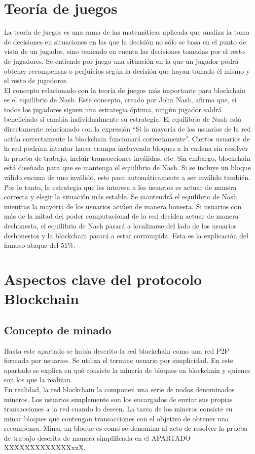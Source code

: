 \section{Teoría de juegos}
La teoría de juegos es una rama de las matemáticas aplicada que analiza la toma de decisiones en situaciones en las que la decisión no sólo se basa en el punto de vista de un jugador, sino teniendo en cuenta las decisiones tomadas por el resto de jugadores. Se entiende por juego una situación en la que un jugador podrá obtener recompensas o perjuicios según la decisión que hayan tomado él mismo y el resto de jugadores. \\
El concepto relacionado con la teoría de juegos más importante para blockchain es el equilibrio de Nash. Este concepto, creado por John Nash, afirma que, si todos los jugadores siguen una estrategia óptima, ningún jugador saldrá beneficiado si cambia individualmente su estrategia. El equilibrio de Nash está directamente relacionado con la expresión “Si la mayoría de los usuarios de la red actúa correctamente la blockchain funcionará correctamente”. Ciertos usuarios de la red podrían intentar hacer trampa incluyendo bloques a la cadena sin resolver la prueba de trabajo, incluir transacciones inválidas, etc. Sin embargo, blockchain está diseñada para que se mantenga el equilibrio de Nash. Si se incluye un bloque válido encima de uno inválido, este pasa automáticamente a ser inválido también. Por lo tanto, la estrategia que les interesa a los usuarios es actuar de manera correcta y elegir la situación más estable. Se mantendrá el equilibrio de Nash mientras la mayoría de los usuarios actúen de manera honesta. Si usuarios con más de la mitad del poder computacional de la red deciden actuar de manera deshonesta, el equilibrio de Nash pasará a localizarse del lado de los usuarios deshonestos y la blockchain pasará a estar corrompida. Esta es la explicación del famoso ataque del 51\%.

\section{Aspectos clave del protocolo Blockchain}
\subsection{Concepto de minado}
Hasta este apartado se había descrito la red blockchain como una red P2P formada por usuarios. Se utiliza el termino usuario por simplicidad. En este apartado se explica en qué consiste la minería de bloques en blockchain y quienes son los que la realizan. \\
En realidad, la red blockchain la componen una serie de nodos denominados mineros. Los usuarios simplemente son los encargados de enviar sus propias transacciones a la red cuando lo deseen. La tarea de los mineros consiste en minar bloques que contengan transacciones con el objetivo de obtener una recompensa. Minar un bloque es como se denomina al acto de resolver la prueba de trabajo descrita de manera simplificada en el APARTADO XXXXXXXXXXXXXxxX.

